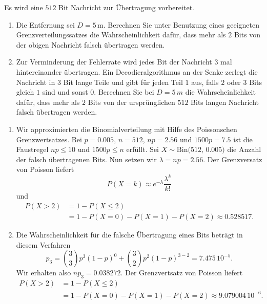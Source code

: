 Es wird eine $512$ Bit Nachricht zur Übertragung vorbereitet.  
\begin{enumerate}
    \item Die Entfernung sei $D=5\,$m. Berechnen Sie unter Benutzung eines
        geeigneten Grenzverteilungssatzes die Wahrscheinlichkeit dafür, dass
        mehr als $2$ Bits von der obigen Nachricht falsch übertragen werden. 

    \item Zur Verminderung der Fehlerrate wird jedes Bit der Nachricht $3$ mal
        hintereinander übertragen. Ein Decodieralgorithmus an der Senke zerlegt
        die Nachricht in $3$ Bit lange Teile und gibt für jeden Teil $1$ aus,
        falls $2$ oder $3$ Bits gleich $1$ sind und sonst $0$. Berechnen Sie
        bei $D=5\,m$ die Wahrscheinlichkeit dafür, dass mehr als $2$ Bits
        von der ursprünglichen $512$ Bits langen Nachricht falsch übertragen
        werden.
\end{enumerate}

\solution
\begin{enumerate}
    \item Wir approximierten die Binomialverteilung mit Hilfe des Poissonschen
        Grenzwertsatzes. Bei $p=0.005$, $n=512$, $np=2.56$ und $1500p = 7.5$
        ist die Faustregel $np \leq 10$ und $1500p\leq n$ erfüllt. Sei $X\sim
        \text{Bin(512, 0.005)}$ die Anzahl der falsch übertragenen Bits. Nun
        setzen wir $\lambda = np = 2.56$. Der Grenzversatz von Poisson liefert
        \begin{equation*}
            P(X=k) \approx e^{-\lambda } \frac{\lambda^{k}}{k!}
        \end{equation*}
        und
        \begin{align*}
            P\left( X>2 \right) &= 1 - P(X \leq 2) \\
            &= 1 - P(X=0)-P(X=1)-P(X=2) \approx 0.528517.
        \end{align*}
    \item Die Wahrscheinlichkeit für die falsche Übertragung eines Bits beträgt
        in diesem Verfahren
        \begin{equation*}
            p_3 = \binom{3}{3} p^{3}\left( 1-p \right)^{0} + \binom{3}{2} p^{2} \left( 1-p \right)^{3-2} = 7.475\, 10^{-5}.
        \end{equation*}
        Wir erhalten also $n p_3 = 0.038272$. Der Grenzvertsatz von Poisson liefert
        \begin{align*}
            P\left( X>2 \right) &= 1 - P(X \leq 2) \\
            &= 1 - P(X=0)-P(X=1)-P(X=2) \approx 9.079004\, 10^{-6}.
        \end{align*}
\end{enumerate}

